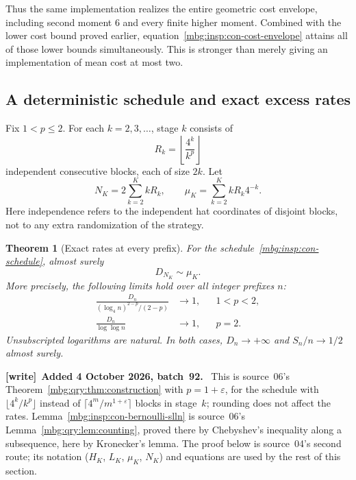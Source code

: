 \documentclass[11pt,letterpaper]{article}
\newtheorem{theorem}{Theorem}[section]
\theoremstyle{definition}
\newenvironment{writenote}[1][]{\par\smallskip\begingroup\small
 \noindent\textbf{[write]}\if\relax\detokenize{#1}\relax\else~\textbf{#1.}\fi\ }%
 {\par\endgroup\smallskip}
\begin{document}
Thus the same implementation realizes the entire geometric cost envelope,
including second moment $6$ and every finite higher moment.  Combined with
the lower cost bound proved earlier, equation~\eqref{mbg:insp:con-cost-envelope}
attains all of those lower bounds simultaneously.  This is stronger than
merely giving an implementation of mean cost at most two.

\subsection{A deterministic schedule and exact excess rates}

Fix $1<p\leq2$.  For each $k=2,3,\ldots$, stage $k$ consists of
\begin{equation}\label{mbg:insp:con-schedule}
 R_k=\left\lfloor\frac{4^k}{k^p}\right\rfloor
\end{equation}
independent consecutive blocks, each of size $2k$.  Let
\begin{equation}\label{mbg:insp:con-endpoints}
 N_K=2\sum_{k=2}^{K}kR_k,
 \qquad
 \mu_K=\sum_{k=2}^{K}kR_k4^{-k}.
\end{equation}
Here independence refers to the independent hat coordinates of disjoint
blocks, not to any extra randomization of the strategy.

\begin{theorem}[Exact rates at every prefix]\label{mbg:insp:con-rate-theorem}
For the schedule~\eqref{mbg:insp:con-schedule}, almost surely
\begin{equation}\label{mbg:insp:con-endpoint-rate}
 D_{N_K}\sim\mu_K.
\end{equation}
More precisely, the following limits hold over all integer prefixes $n$:
\begin{align}
 \frac{D_n}{(\log_4 n)^{2-p}/(2-p)}&\longrightarrow1,
       &&1<p<2,\label{mbg:insp:con-all-prefix-power}\\
 \frac{D_n}{\log\log n}&\longrightarrow1,
       &&p=2.\label{mbg:insp:con-all-prefix-loglog}
\end{align}
Unsubscripted logarithms are natural.  In both cases,
$D_n\to+\infty$ and $S_n/n\to1/2$ almost surely.
\end{theorem}

\begin{writenote}[Added 4 October 2026, batch~92]
This is source~06's Theorem~\ref{mbg:qry:thm:construction} with $p=1+\varepsilon$, for the schedule with $\lfloor4^k/k^p\rfloor$ instead of $\lceil4^m/m^{1+\varepsilon}\rceil$ blocks in stage~$k$; rounding does not affect the rates. Lemma~\ref{mbg:insp:con-bernoulli-slln} is source~06's Lemma~\ref{mbg:qry:lem:counting}, proved there by Chebyshev's inequality along a subsequence, here by Kronecker's lemma. The proof below is source~04's second route; its notation ($H_K$, $L_K$, $\mu_K$, $N_K$) and equations are used by the rest of this section.
\end{writenote}
\end{document}
